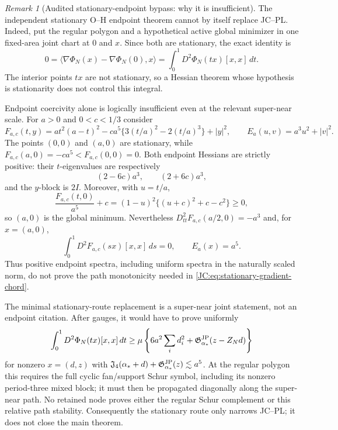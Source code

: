 \documentclass[11pt]{amsart}
\numberwithin{equation}{section}
\theoremstyle{definition}
\theoremstyle{remark}
\newtheorem{remark}[theorem]{Remark}
\newcommand{\Jfour}{\mathfrak J_4}
\newcommand{\Gjp}{\mathfrak G^{\rm JP}}
\begin{document}
\begin{remark}[Audited stationary-endpoint bypass: why it is insufficient]
The independent stationary O--H endpoint theorem cannot by itself replace
JC--PL.  Indeed, put the regular polygon and a hypothetical active global
minimizer in one fixed-area joint chart at $0$ and $x$.  Since both are
stationary, the exact identity is
\begin{equation}\label{JC:eq:stationary-gradient-chord}
 0=\langle\nabla\Phi_N(x)-\nabla\Phi_N(0),x\rangle
 =\int_0^1D^2\Phi_N(tx)[x,x]\,dt.
\end{equation}
The interior points $tx$ are not stationary, so a Hessian theorem whose
hypothesis is stationarity does not control this integral.

Endpoint coercivity alone is logically insufficient even at the relevant
super-near scale.  For $a>0$ and $0<c<1/3$ consider
\[
 F_{a,c}(t,y)=a t^2(a-t)^2
 -ca^5\{3(t/a)^2-2(t/a)^3\}+|y|^2,
 \qquad E_a(u,v)=a^3u^2+|v|^2.
\]
The points $(0,0)$ and $(a,0)$ are stationary, while
$F_{a,c}(a,0)=-ca^5<F_{a,c}(0,0)=0$.  Both endpoint Hessians are strictly
positive: their $t$-eigenvalues are respectively
\[
 (2-6c)a^3,\qquad (2+6c)a^3,
\]
and the $y$-block is $2I$.  Moreover, with $u=t/a$,
\[
 \frac{F_{a,c}(t,0)}{a^5}+c
 =(1-u)^2\{(u+c)^2+c-c^2\}\ge0,
\]
so $(a,0)$ is the global minimum.  Nevertheless
$D_{tt}^2F_{a,c}(a/2,0)=-a^3$ and, for $x=(a,0)$,
\[
 \int_0^1D^2F_{a,c}(sx)[x,x]\,ds=0,
 \qquad E_a(x)=a^5.
\]
Thus positive endpoint spectra, including uniform spectra in the naturally
scaled norm, do not prove the path monotonicity needed in
\eqref{JC:eq:stationary-gradient-chord}.

The minimal stationary-route replacement is a super-near joint statement,
not an endpoint citation.  After gauges, it would have to prove uniformly
\begin{equation}\label{JC:eq:stationary-super-near-cut}
 \int_0^1D^2\Phi_N(tx)[x,x]\,dt
 \ge\mu\left\{6a^2\sum_i d_i^2
 +\Gjp_{\alpha_*}(z-Z_Nd)\right\}
\end{equation}
for nonzero $x=(d,z)$ with
$\Jfour(\alpha_*+d)+\Gjp_{\alpha_*}(z)\lesssim a^5$.
At the regular polygon this requires the full cyclic fan/support Schur
symbol, including its nonzero period-three mixed block; it must then be
propagated diagonally along the super-near path.  No retained node proves
either the regular Schur complement or this relative path stability.
Consequently the stationary route only narrows JC--PL; it does not close
the main theorem.
\end{remark}
\end{document}
